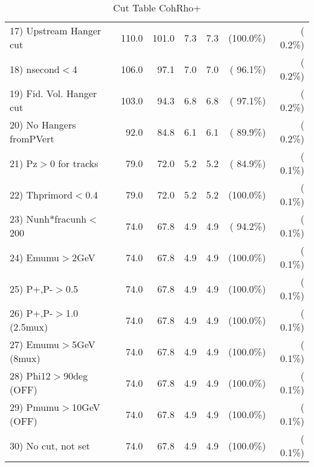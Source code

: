 \begin{table}[h!]
\begin{tabular}{||l||r|r|r|r|r|r||}
 17) Upstream Hanger cut  &        110.0 &        101.0 &          7.3 &          7.3 & (100.0\%) & (  0.2\%) \\
 18) nsecond$<$4          &        106.0 &         97.1 &          7.0 &          7.0 & ( 96.1\%) & (  0.2\%) \\
 19) Fid. Vol. Hanger cut &        103.0 &         94.3 &          6.8 &          6.8 & ( 97.1\%) & (  0.2\%) \\
 20) No Hangers fromPVert &         92.0 &         84.8 &          6.1 &          6.1 & ( 89.9\%) & (  0.2\%) \\
 21) Pz$>$0 for tracks    &         79.0 &         72.0 &          5.2 &          5.2 & ( 84.9\%) & (  0.1\%) \\
 22) Thprimord$<$0.4      &         79.0 &         72.0 &          5.2 &          5.2 & (100.0\%) & (  0.1\%) \\
 23) Nunh*fracunh$<$200   &         74.0 &         67.8 &          4.9 &          4.9 & ( 94.2\%) & (  0.1\%) \\
 24) Emumu$>$2GeV         &         74.0 &         67.8 &          4.9 &          4.9 & (100.0\%) & (  0.1\%) \\
 25) P+,P-$>$0.5          &         74.0 &         67.8 &          4.9 &          4.9 & (100.0\%) & (  0.1\%) \\
 26) P+,P-$>$1.0 (2.5mux) &         74.0 &         67.8 &          4.9 &          4.9 & (100.0\%) & (  0.1\%) \\
 27) Emumu$>$5GeV  (8mux) &         74.0 &         67.8 &          4.9 &          4.9 & (100.0\%) & (  0.1\%) \\
 28) Phi12$>$90deg  (OFF) &         74.0 &         67.8 &          4.9 &          4.9 & (100.0\%) & (  0.1\%) \\
 29) Pmumu$>$10GeV  (OFF) &         74.0 &         67.8 &          4.9 &          4.9 & (100.0\%) & (  0.1\%) \\
 30) No cut, not set      &         74.0 &         67.8 &          4.9 &          4.9 & (100.0\%) & (  0.1\%) \\
 \hline
 \hline
 \end{tabular}
 \caption{Cut Table  CohRho+  }
 \label{tab-cutcohjpsi-mumu_anumunc}
 \end{table}
